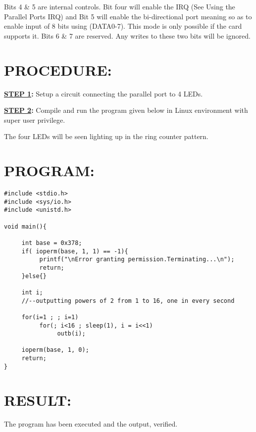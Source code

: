 Bits 4 \& 5 are internal controls. Bit four will enable the IRQ (See Using the Parallel Ports IRQ) and Bit 5 will enable the bi-directional port meaning so as to enable input of 8 bits using (DATA0-7). This mode is only possible if the card supports it. Bits 6 \& 7 are reserved. Any writes to these two bits will be ignored. 

\section*{PROCEDURE:}
\textbf{\underline{STEP 1}:} 
Setup a circuit connecting the parallel port to 4 LEDs.

\textbf{\underline{STEP 2}:} Compile and run the program given below in Linux environment with super user privilege.

The four LEDs will be seen lighting up in the ring counter pattern.

\section*{PROGRAM:}
\begin{lstlisting}
#include <stdio.h>
#include <sys/io.h>
#include <unistd.h>

void main(){

     int base = 0x378;
     if( ioperm(base, 1, 1) == -1){
          printf("\nError granting permission.Terminating...\n");
          return;
     }else{}
     
     int i;
     //--outputting powers of 2 from 1 to 16, one in every second
     
     for(i=1 ; ; i=1)
          for(; i<16 ; sleep(1), i = i<<1)
               outb(i);
     
     ioperm(base, 1, 0);
     return;  
}
\end{lstlisting}

\section*{RESULT:}
The program has been executed and the output, verified.
%
%

